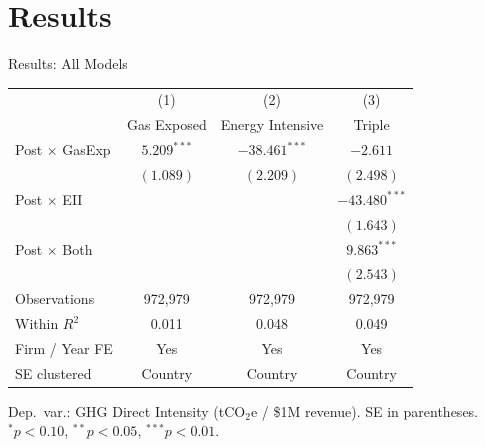 \documentclass[10pt]{beamer}
\begin{document}
\section{Results}

\begin{frame}{Results: All Models}
  \begin{center}
    \small
    \begin{tabular}{lccc}
      \toprule
       & (1) & (2) & (3) \\
       & Gas Exposed & Energy Intensive & Triple \\
      \midrule
      Post $\times$ GasExp
        & $5.209^{***}$ & $-38.461^{***}$ & $-2.611$ \\
        & $(1.089)$ & $(2.209)$ & $(2.498)$ \\[3pt]
      Post $\times$ EII
        & & & $-43.480^{***}$ \\
        & & & $(1.643)$ \\[3pt]
      Post $\times$ Both
        & & & $9.863^{***}$ \\
        & & & $(2.543)$ \\[3pt]
      \midrule
      Observations & 972{,}979 & 972{,}979 & 972{,}979 \\
      Within $R^2$  & 0.011 & 0.048 & 0.049 \\
      Firm / Year FE & Yes & Yes & Yes \\
      SE clustered & Country & Country & Country \\
      \bottomrule
    \end{tabular}
    \par\vspace{0.4em}
    {\tiny Dep.\ var.: GHG Direct Intensity (tCO$_2$e / \$1M revenue).
      SE in parentheses. $^{*}p<0.10$, $^{**}p<0.05$, $^{***}p<0.01$.}
  \end{center}
\end{frame}

\end{document}
